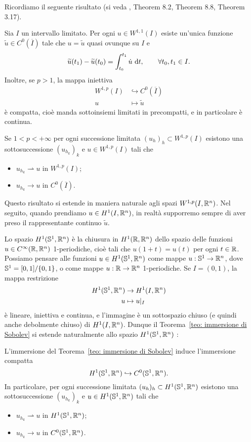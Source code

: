 Ricordiamo il seguente risultato (si veda \cite{brezis2011functional}, Theorem 8.2, Theorem 8.8, Theorem 3.17).
\begin{teo}\label{teo: immersione di Sobolev}
	Sia \(I\) un intervallo limitato. Per ogni \(u \in W^{1,1}(I)\) esiste un'unica funzione \(\widetilde{u} \in C^0(\overline{I})\) tale che \(u=\widetilde{u}\) quasi ovunque su \(I\) e
	\[
	\widetilde{u}(t_1)-\widetilde{u}(t_0) = \int_{t_0}^{t_1}\dot u \ \mathrm{d} t, \qquad \forall t_0,t_1 \in I.
	\]
	Inoltre, se \(p>1\), la mappa iniettiva
	\begin{align*}
		W^{1,p}(I) &\hookrightarrow C^0(\overline{I}) \\
		u &\mapsto \widetilde{u}
	\end{align*}
	è compatta, cioè manda sottoinsiemi limitati in precompatti, e in particolare è continua. 
	
	Se \(1<p<+\infty\) per ogni successione limitata \((u_h)_h \subset W^{1,p}(I)\) esistono una sottosuccessione \((u_{h_k})_k\) e \(u \in W^{1,p}(I)\) tali che
	\begin{itemize}
		\item \(u_{h_k} \rightharpoonup u\) in \(W^{1,p}(I)\);
		\item \(u_{h_k} \to u\) in \(C^0(\overline{I})\).
	\end{itemize}
\end{teo}
Questo risultato si estende in maniera naturale agli spazi \(W^{1,p}(I,\mathbb{R}^n)\). Nel seguito, quando prendiamo \(u \in H^1(I,\mathbb{R}^n)\), in realtà supporremo sempre di aver preso il rappresentante continuo \(\widetilde{u}\). 

Lo spazio \(H^1(\mathbb{S}^1,\mathbb{R}^n)\) è la chiusura in \(H^1(\mathbb{R},\mathbb{R}^n)\) dello spazio delle funzioni \(u \in C^\infty(\mathbb{R},\mathbb{R}^n)\) 1-periodiche, cioè tali che \(u(1+t) = u(t)\) per ogni \(t \in \mathbb{R}\). Possiamo pensare alle funzioni \(u \in H^1(\mathbb{S}^1,\mathbb{R}^n)\) come mappe \(u: \mathbb{S}^1 \to \mathbb{R}^n\), dove \(\mathbb{S}^1 = [0,1]/\{0,1\}\), o come mappe \(u: \mathbb{R} \to \mathbb{R}^n\) 1-periodiche. Se \(I=(0,1)\), la mappa restrizione
\begin{align*}
	H^1(\mathbb{S}^1,\mathbb{R}^n) &\to H^1(I,\mathbb{R}^n) \\
	u &\mapsto u|_I
\end{align*}
è lineare, iniettiva e continua, e l'immagine è un sottospazio chiuso (e quindi anche debolmente chiuso) di \(H^1(I,\mathbb{R}^n)\). Dunque il Teorema~\ref{teo: immersione di Sobolev} si estende naturalmente allo spazio \(H^1(\mathbb{S}^1,\mathbb{R}^n)\) :

\begin{teo}\label{teo: immersione Sobolev per S^1}
	L'immersione del Teorema~\ref{teo: immersione di Sobolev} induce l'immersione compatta
	\[
		H^1(\mathbb{S}^1,\mathbb{R}^n) \hookrightarrow C^0(\mathbb{S}^1,\mathbb{R}^n).
	\]
	In particolare, per ogni successione limitata \((u_h)_h \subset H^1(\mathbb{S}^1,\mathbb{R}^n)\) esistono una sottosuccessione \((u_{h_k})_k\) e \(u \in H^1(\mathbb{S}^1,\mathbb{R}^n)\) tali che
	\begin{itemize}
		\item \(u_{h_k} \rightharpoonup u\) in \(H^1(\mathbb{S}^1,\mathbb{R}^n)\);
		\item \(u_{h_k} \to u\) in \(C^0(\mathbb{S}^1,\mathbb{R}^n)\).
	\end{itemize}
\end{teo}

